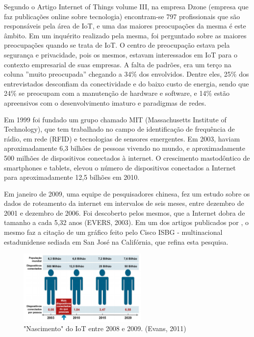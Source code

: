 \documentclass[journal]{IEEEtran}
\begin{document}
Segundo o Artigo Internet of Things volume III, na empresa Dzone (empresa que faz publicações online sobre tecnologia) encontram-se 797 profissionais que são responsáveis pela área de IoT, e uma das maiores preocupações da mesma é este âmbito. Em um inquérito realizado pela mesma, foi perguntado sobre as maiores preocupações quando se trata de IoT. O centro de preocupação estava pela segurança e privacidade, pois os mesmos, estavam interessados em IoT para o contexto empresarial de suas empresas. A falta de padrões, era um terço na coluna ''muito preocupada'' chegando a 34\% dos envolvidos. Dentre eles, 25\% dos entrevistados desconfiam da conectividade e do baixo custo de energia, sendo que 24\% se preocupam com a manutenção de hardware e software, e 14\% estão apreensivos com o desenvolvimento imaturo e paradigmas de redes. \cite[p.~4]{Evans}

Em 1999 foi fundado um grupo chamado MIT (Massachusetts Institute of Technology), que tem trabalhado no campo de identificação de frequência de rádio, em rede (RFID) e tecnologias de sensores emergentes. Em 2003, haviam aproximadamente 6,3 bilhões de pessoas vivendo no mundo, e aproximadamente 500 milhões de dispositivos conectados à internet. O crescimento mastodôntico de smartphones e tablets, elevou o número de dispositivos conectados a Internet para aproximadamente 12,5 bilhões em 2010. \cite[p.~3]{Evans}

Em janeiro de 2009, uma equipe de pesquisadores chinesa, fez um estudo sobre os dados de roteamento da internet em intervalos de seis meses, entre dezembro de 2001 e dezembro de 2006. Foi descoberto pelos mesmos, que a Internet dobra de tamanho a cada 5,32 anos (EVERS, 2003). Em um dos artigos publicados por \cite{Evans}, o mesmo faz a citação de um gráfico feito pelo Cisco ISBG - multinacional estadunidense sediada em San José na Califórnia, que refina esta pesquisa. 

\begin{figure}[h]
\centering
\includegraphics[width=2.5in]{um}
\caption{"Nascimento" do IoT entre 2008 e 2009. (Evans, 2011)}
\label{fig_um}
\end{figure}
\end{document}
